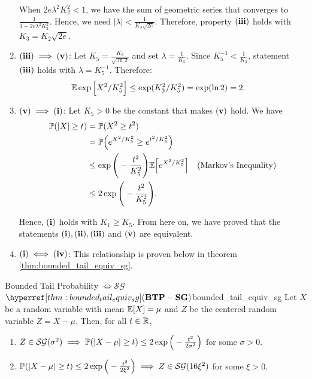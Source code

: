\begin{proof*}
\begin{enumerate}
		\noindent When $2e\lambda^2K_2^2 < 1$, we have the sum of geometric series that converges to $\frac{1}{1 - 2e\lambda^2K_2^2}$. Hence, we need $|\lambda| < \frac{1}{K_2\sqrt{2e}}$. Therefore, property $\bf (iii)$ holds with $K_3 = K_2\sqrt{2e}$.

		\item ${\bf (iii)}\implies {\bf (v)}$: Let $K_5=\frac{K_3}{\sqrt{\ln 2}}$ and set $\lambda=\frac{1}{K_5}$. Since $K_5^{-1} < \frac{1}{K_3}$, statement $\bf (iii)$ holds with $\lambda=K_5^{-1}$. Therefore:
		\begin{align*}
			\mathbb{E}\exp\Big[ X^2/K_5^2 \Big] &\le \exp(K_3^2/K_5^2) = \exp(\ln 2) = 2.
		\end{align*} 

		\item ${\bf (v)}\implies{\bf (i)}$: Let $K_5>0$ be the constant that makes $\bf (v)$ hold. We have
		\begin{align*}
			\mathbb{P}(|X| \ge t) &= \mathbb{P}(X^2\ge t^2) \\
				&= \mathbb{P}\Big( e^{X^2/K_5^2} \ge e^{t^2/K_5^2} \Big) \\
				&\le \exp\Bigg( -\frac{t^2}{K_5^2} \Bigg)\mathbb{E}\Big[ e^{X^2/K_5^2} \Big] \quad \text{(Markov's Inequality)} \\
				&\le 2\exp\Bigg( -\frac{t^2}{K_5^2} \Bigg).
		\end{align*} 

		\noindent Hence, $\bf (i)$ holds with $K_1\ge K_5$. From here on, we have proved that the statements $\bf (i), (ii), (iii)$ and $\bf (v)$ are equivalent. 

		\item ${\bf (i)} \iff {\bf (iv)}$: This relationship is proven below in theorem \ref{thm:bounded_tail_equiv_sg}.
	\end{enumerate} 
\end{proof*} 

\begin{theorem}{Bounded Tail Probability $\iff \mathcal{SG}$ $\BTPSG$}{bounded_tail_equiv_sg}
	Let $X$ be a random variable with mean $\mathbb{E}[X] = \mu$ and $Z$ be the centered random variable $Z=X-\mu$. Then, for all $t\in\mathbb{R}$,
	\begin{enumerate}[label=(\roman*)]
		\item $Z\in\mathcal{SG}(\sigma^2) \implies \mathbb{P} ({|X-\mu|\ge t}) \le 2\exp\Big( -\frac{t^2}{2\sigma^2} \Big)$ for some $\sigma>0$.
		\item $\mathbb{P} ({|X-\mu|\ge t}) \le 2\exp\Big( -\frac{t^2}{2\xi^2} \Big) \implies Z\in\mathcal{SG}(16\xi^2)$ for some $\xi>0$.
	\end{enumerate} 
\end{theorem} 

